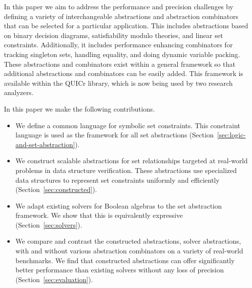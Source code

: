 In this paper we aim to address the performance and precision challenges by defining a variety of interchangeable abstractions and abstraction combinators that can be selected for a particular application.  This includes abstractions based on binary decision diagrams, satisfiability modulo theories, and linear set constraints.  Additionally, it includes performance enhancing combinators for tracking singleton sets, handling equality, and doing dynamic variable packing.  These abstractions and combinators exist within a general framework so that additional abstractions and combinators can be easily added.  This framework is available within the QUICr library, which is now being used by two research analyzers.

In this paper we make the following contributions.
\begin{itemize}
    \item We define a common language for symbolic set constraints.  This constraint language is used as the framework for all set abstractions (Section~\ref{sec:logic-and-set-abstraction}).
    \item We construct scalable abstractions for set relationships targeted at real-world problems in data structure verification.  These abstractions use specialized data structures to represent set constraints uniformly and efficiently (Section~\ref{sec:constructed}).
    \item We adapt existing solvers for Boolean algebras to the set abstraction framework.  We show that this is equivalently expressive (Section~\ref{sec:solvers}).
    \item We compare and contrast the constructed abstractions, solver abstractions, with and without various abstraction combinators on a variety of real-world benchmarks.  We find that
    constructed abstractions can offer significantly better performance than existing solvers without any loss of precision (Section~\ref{sec:evaluation}).
\end{itemize}